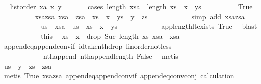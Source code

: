 \begin{isabellebody}
\ \isamarkupfalse%
\ {\isachardoublequoteopen}list{\isacharunderscore}order\ xa\ x\ y{\isachardoublequoteclose}\isanewline
\ \ \ \ \ \ \isamarkupfalse%
{\isacharparenleft}cases\ {\isachardoublequoteopen}length\ xsa\ {\isasymle}\ length\ {\isacharparenleft}xs\ {\isacharat}\ x\ {\isacharhash}\ ys{\isacharparenright}{\isachardoublequoteclose}{\isacharparenright}\isanewline
\ \ \ \ \ \ \ \ \isamarkupfalse%
\ True\isanewline
\ \ \ \ \ \ \ \ \isamarkupfalse%
\ xsa{\isacharunderscore}zsa{}{\isacharcolon}\ {\isachardoublequoteopen}xsa\ {\isacharat}\ zsa\ {\isacharequal}\ {\isacharparenleft}xs\ {\isacharat}\ x\ {\isacharhash}\ ys{\isacharparenright}\ {\isacharat}\ {\isacharparenleft}y\ {\isacharhash}\ zs{\isacharparenright}{\isachardoublequoteclose}\isanewline
\ \ \ \ \ \ \ \ \ \ \isamarkupfalse%
\ {\isacharparenleft}simp\ add{\isacharcolon}\ xsa{\isacharunderscore}zsa{\isacharparenright}\isanewline
\ \ \ \ \ \ \ \ \isamarkupfalse%
\ \isamarkupfalse%
\ us\ \ {\isachardoublequoteopen}xsa\ {\isacharat}\ us\ {\isacharequal}\ xs\ {\isacharat}\ x\ {\isacharhash}\ ys{\isachardoublequoteclose}\isanewline
\ \ \ \ \ \ \ \ \ \ \isamarkupfalse%
\ app{\isacharunderscore}length{\isacharunderscore}lt{\isacharunderscore}exists\ True\ \isamarkupfalse%
\ blast\isanewline
\ \ \ \ \ \ \ \ \isamarkupfalse%
\ \isamarkupfalse%
\ this\ \isamarkupfalse%
\ {\isachardoublequoteopen}xs\ {\isacharat}\ x\ {\isacharhash}\ {\isacharparenleft}drop\ {\isacharparenleft}Suc\ {\isacharparenleft}length\ xs{\isacharparenright}{\isacharparenright}\ xsa{\isacharparenright}\ {\isacharequal}\ xsa{\isachardoublequoteclose}\isanewline
\ \ \ \ \ \ \ \ \ \ \isamarkupfalse%
\ append{\isacharunderscore}eq{\isacharunderscore}append{\isacharunderscore}conv{\isacharunderscore}if\ id{\isacharunderscore}take{\isacharunderscore}nth{\isacharunderscore}drop\ linorder{\isacharunderscore}not{\isacharunderscore}less\isanewline
\ \ \ \ \ \ \ \ \ \ \ \ nth{\isacharunderscore}append\ nth{\isacharunderscore}append{\isacharunderscore}length\ False\ \isamarkupfalse%
\ metis\isanewline
\ \ \ \ \ \ \ \ \isamarkupfalse%
\ \isamarkupfalse%
\ {\isachardoublequoteopen}us\ {\isacharat}\ y\ {\isacharhash}\ zs\ {\isacharequal}\ zsa{\isachardoublequoteclose}\isanewline
\ \ \ \ \ \ \ \ \ \ \isamarkupfalse%
\ {\isacharparenleft}metis\ True\ xsa{\isacharunderscore}zsa{}\ append{\isacharunderscore}eq{\isacharunderscore}append{\isacharunderscore}conv{\isacharunderscore}if\ append{\isacharunderscore}eq{\isacharunderscore}conv{\isacharunderscore}conj\ calculation{\isacharparenleft}{}{\isacharparenright}{\isacharparenright}\isanewline

\end{isabellebody}

